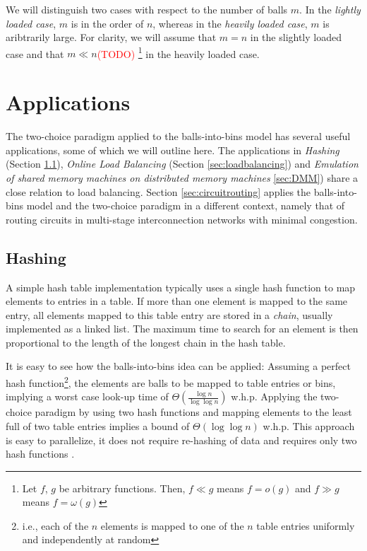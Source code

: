 \documentclass[a4paper,12pt]{article}
\newcommand\todo[1]{\textcolor{red}{(#1)}}
\begin{document}
We will distinguish two cases with respect to the number of balls $m$. In the \emph{lightly loaded case}, $m$ is in the order of $n$, whereas in the \emph{heavily loaded case}, $m$ is aribtrarily large. For clarity, we will assume that $m = n$ in the slightly loaded case and that $m \ll n$\todo{TODO} \footnote{Let $f$, $g$ be arbitrary functions. Then, $f \ll g$ means $f = o(g)$ and $ f \gg g$ means $f = \omega(g)$} in the heavily loaded case. 

\section{Applications}
\label{sec:applications}
The two-choice paradigm applied to the balls-into-bins model has several useful applications, some of which we will outline here. The applications in \emph{Hashing} (Section \ref{sec:hashing}), \emph{Online Load Balancing} (Section \ref{sec:loadbalancing}) and \emph{Emulation of shared memory machines on distributed memory machines} \ref{sec:DMM}) share a close relation to load balancing. Section \ref{sec:circuitrouting} applies the balls-into-bins model and the two-choice paradigm in a different context, namely that of routing circuits in multi-stage interconnection networks with minimal congestion.

\subsection{Hashing}
\label{sec:hashing}
A simple hash table implementation typically uses a single hash function to map elements to entries in a table. If more than one element is mapped to the same entry, all elements mapped to this table entry are stored in a \emph{chain}, usually implemented as a linked list. The maximum time to search for an element is then proportional to the length of the longest chain in the hash table. 

It is easy to see how the balls-into-bins idea can be applied: Assuming a perfect hash function\footnote{i.e., each of the $n$ elements is mapped to one of the $n$ table entries uniformly and independently at random}, the elements are balls to be mapped to table entries or bins, implying a worst case look-up time of $\Theta\left(\frac{\log n}{\log \log n}\right)$ w.h.p. Applying the two-choice paradigm by using two hash functions and mapping elements to the least full of two table entries implies a bound of $\Theta\left(\log \log n\right)$ w.h.p. This approach is easy to parallelize, it does not require re-hashing of data and requires only two hash functions \cite{ABKU99} \cite{MRS01}.
\end{document}
